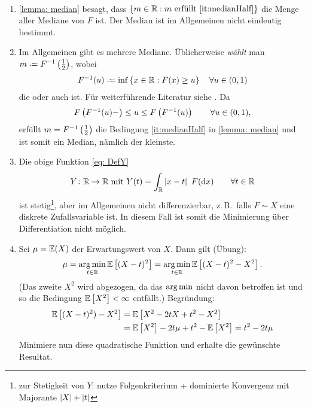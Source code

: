 \begin{bemerkung}~
	\begin{enumerate}[label=(\arabic*), leftmargin=*]
		\item \cref{lemma: median} besagt, dass $\menge{ m \in \R : m \text{ erfüllt \cref{it:medianHalf}}}$ die Menge aller Mediane von $F$ ist. Der Median ist im Allgemeinen nicht eindeutig bestimmt.
		\item Im Allgemeinen gibt es mehrere Mediane. Üblicherweise \textit{wählt} man $m \defeq F^{-1} \brackets{\frac{1}{2}}$, wobei
			\begin{align*}
				F^{-1}(u) \defeq \inf\menge{ x \in \R: F(x) \ge u} \quad \forall u \in (0,1)
			\end{align*}
			die  oder auch  ist. Für weiterführende Literatur siehe \cite[Seite 20]{witting1985mathStat}. Da
			\begin{align*}
				F\left( F^{-1}(u)- \right) \le u \le F\left( F^{-1}(u) \right) \qquad \forall u \in (0,1),
			\end{align*}
			erfüllt $m = F^{-1}\left( \frac{1}{2} \right)$ die Bedingung \ref{it:medianHalf} in \cref{lemma: median} und ist somit ein Median, nämlich der kleinste.
		\item Die obige Funktion \eqref{eq: DefY}
			\begin{align*}
				Y \colon \mathbb{R} \to \mathbb{R} \text{ mit } Y(t) = \int_{\mathbb{R}} \left| x-t \right|~F(\mathrm{d}x) \qquad \forall t\in\mathbb{R}
			\end{align*}
			ist stetig\footnote{zur Stetigkeit von $Y$: nutze Folgenkriterium + dominierte Konvergenz mit Majorante $\left| X \right| + \left| t \right|$}, aber im Allgemeinen nicht differenzierbar, z.\,B.\ falls $F \sim X$ eine diskrete Zufallsvariable ist. In diesem Fall ist somit die Minimierung über Differentiation nicht möglich.
		\item Sei $\mu = \mathbb{E}(X)$ der Erwartungswert von $X$. Dann gilt (Übung):
			\begin{equation*}
				\mu = \operatorname*{arg\,min}_{t \in \mathbb{R}} \mathbb{E}\left[ (X-t)^2 \right] = \operatorname*{arg\,min}_{t \in \mathbb{R}} \mathbb{E}\left[ (X-t)^2 - X^2 \right].
			\end{equation*}
			(Das zweite $X^2$ wird abgezogen, da das $\operatorname*{arg\,min}$ nicht davon betroffen ist und so die Bedingung $\mathbb{E}\left[ X^2 \right]<\infty$ entfällt.)
			Begründung:
			\begin{align*}
				\mathbb{E}\left[ (X-t)^2) - X^2 \right]
				&= \mathbb{E}\left[ X^2 - 2tX + t^2 - X^2 \right] \\
				&= \mathbb{E}\left[ X^2 \right] - 2t\mu + t^2 - \mathbb{E}\left[ X^2 \right]
				= t^2 - 2t\mu
			\end{align*}
			Minimiere nun diese quadratische Funktion und erhalte die gewünschte Resultat.
	\end{enumerate}
\end{bemerkung}

